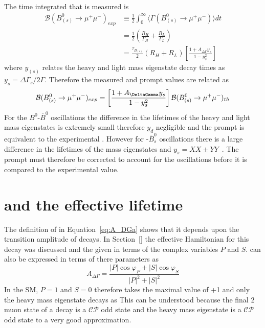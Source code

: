 The time integrated \BF that is measured is
\begin{align}
  \mathcal{B}(B^{0}_{(s)} \to \mu^{+}\mu^{-})_{exp} &\equiv \frac{1}{2} \int^{\infty}_0 \langle \Gamma (B^{0}_{(s)} \to \mu^{+}\mu^{-}) \rangle  dt \nonumber \\
&= \frac{1}{2} \left( \frac{R_{H}}{\Gamma_{H}} + \frac{R_{L}}{\Gamma_{L}} \right) \nonumber \\
&= \frac{\tau_{B_{(s)}}}{2}(R_{H} + R_{L}) \left[ \frac{1 + A_{\Delta\Gamma}y_{s}}{1 - y_{s}^{2}} \right]
\end{align}
where $y_{(s)}$ relates the heavy and light mass eigenstate decay times as $y_s = \Delta \Gamma_s / 2\Gamma$. Therefore the measured and prompt \BF values are related as
\begin{equation}
  \mathcal{B}(B^0_{(s)} \to \mu^+\mu^-)_{exp} = \left[ \frac{1 + A_{\DeltaGamma}y_{s}}{1 - y_{s}^{2}} \right] \mathcal{B}(B^0_{(s)} \to \mu^+ \mu^-)_{th}
\end{equation}
For the $B^0$-$\overline{B}^0$ oscillations the difference in the lifetimes of the heavy and light mass eigenstates is extremely small therefore $y_d$ negligible and the prompt \BF is equivalent to the experimental \BF. However for \bs-$\overline{B}^0_s$ oscillations there is a large difference in the lifetimes of the mass eigenstates and $y_s =XX \pm YY$~\cite{}. The prompt \BF must therefore be corrected to account for the oscillations before it is compared to the experimental value.
\section{\ADG and the effective lifetime}
\label{sec:ADG_EL}
The definition of \ADG in Equation~\ref{eq:A_DGa} shows that it depends upon the transition amplitude of \bsmumu decays. In Section~\ref{} the effective Hamiltonian for this decay was discussed and the \BF given in terms of the complex variables $P$ and $S$. \ADG can also be expressed in terms of there parameters as~\cite{}
\begin{equation}
A_{\Delta \Gamma} = \frac{|P|\cos \varphi_P + |S| \cos \varphi_S}{|P|^2 + |S|^2}
\label{eq:NP_ADG}
\end{equation}
In the SM, $P=1$ and $S=0$ therefore \ADG takes the maximal value of +1 and only the heavy mass eigenstate decays as \bsmumu This can be understood because the final 2 muon state of a \bsmumu decay is a $\mathcal{CP}$ odd state and the heavy \bs mass eigenstate is a $\mathcal{CP}$ odd state to a very good approximation.

